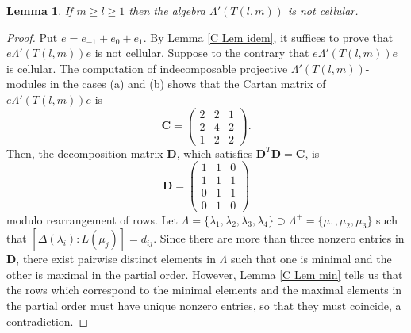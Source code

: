 \documentclass[12pt]{amsart}
\newtheorem{lem}[thm]{Lemma}
\numberwithin{equation}{thm}
\newcommand\bC{\mathbf C}
\newcommand\bD{\mathbf D}
\newcounter{ni}
\begin{document}
\begin{lem}
\label{D I-2 (a)}
If $m\ge l\geq 1$ then the algebra $\Lambda'(T(l,m))$ is not cellular.
\end{lem}
\begin{proof}
Put $e=e_{-1}+e_0+e_1$. By Lemma \ref{C Lem idem}, it suffices to prove that $e\Lambda'(T(l,m))e$ is not cellular. 
Suppose to the contrary that $e\Lambda'(T(l,m))e$ is cellular. 
The computation of indecomposable projective $\Lambda'(T(l,m))$-modules in the cases (a) and (b) 
shows that the Cartan matrix of $e\Lambda'(T(l,m))e$ is
\[
\bC=\begin{pmatrix}
2 & 2 & 1 \\
2 & 4 & 2 \\
1 & 2 & 2 \end{pmatrix}.
\]
Then, the decomposition matrix $\bD$, which satisfies $\bD^T\bD=\bC$, is
\[
\bD=\begin{pmatrix}
 1 & 1 & 0\\
 1 & 1 & 1\\
 0 & 1 & 1\\
 0 & 1 & 0\end{pmatrix}
\]
modulo rearrangement of rows. Let $\Lambda=\{\lambda_1, \lambda_2, \lambda_3, \lambda_4\}\supset \Lambda^+=\{\mu_1,\mu_2,\mu_3\}$ 
such that $[\Delta(\lambda_i):L(\mu_j)]=d_{ij}$. 
Since there are more than three nonzero entries in $\bD$, there exist pairwise distinct elements in $\Lambda$ such that 
one is minimal and the other is maximal in the partial order. 
However, Lemma \ref{C Lem min} tells us that the rows which correspond to the minimal elements and the maximal elements in the partial order 
must have unique nonzero entries, so that they must coincide, a contradiction. 
\end{proof}
\end{document}
